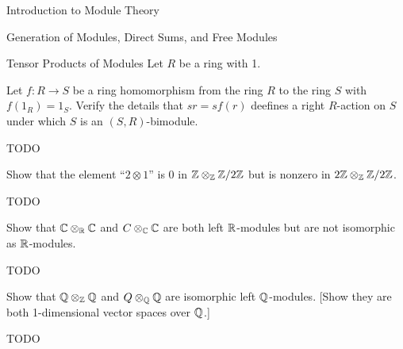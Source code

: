 \begin{chapter}{Introduction to Module Theory}
\begin{section}{Generation of Modules, Direct Sums, and Free Modules}
\begin{solution}
\end{solution}\oneperpage



\end{section}









\begin{section}{Tensor Products of Modules}
Let $R$ be a ring with 1. 
\begin{problem}\label{ex:10.4.1}
Let $f:R\to S$ be a ring homomorphism from the ring $R$ to the ring $S$ with $f(1_R) = 1_S$. Verify the details that $sr = sf(r)$ deefines a right $R$-action on $S$ under which $S$ is an $(S,R)$-bimodule. 
\end{problem}
\begin{solution}TODO

\end{solution}\oneperpage



\begin{problem}\label{ex:10.4.2}
Show that the element ``$2\otimes 1$'' is $0$ in $\mathbb{Z}\otimes_{\mathbb{Z}} \mathbb{Z}/2\mathbb{Z}$ but is nonzero in $2\mathbb{Z}\otimes_{\mathbb{Z}} \mathbb{Z}/2\mathbb{Z}$. 
\end{problem}
\begin{solution}TODO

\end{solution}\oneperpage



\begin{problem}\label{ex:10.4.3}
Show that $\mathbb{C}\otimes_{\mathbb{R}}\mathbb{C}$ and $C\otimes _{\mathbb{C}}\mathbb{C}$ are both left $\mathbb{R}$-modules but are not isomorphic as $\mathbb{R}$-modules.
\end{problem}
\begin{solution}TODO

\end{solution}\oneperpage



\begin{problem}\label{ex:10.4.4}
Show that $\mathbb{Q}\otimes_{\mathbb{Z}}\mathbb{Q}$ and $Q\otimes_{\mathbb{Q}}\mathbb{Q}$ are isomorphic left $\mathbb{Q}$-modules. [Show they are both 1-dimensional vector spaces over $\mathbb{Q}$.]
\end{problem}
\begin{solution}TODO

\end{solution}\oneperpage




\end{section}
\end{chapter}
